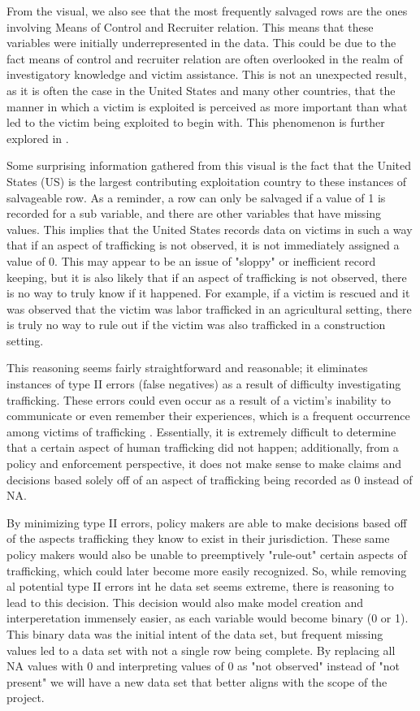 \documentclass{article} %
\begin{document}
From the visual, we also see that the most frequently salvaged rows are the ones involving Means of Control and Recruiter relation. This means that these variables were initially underrepresented in the data. This could be due to the fact means of control and recruiter relation are often overlooked in the realm of investigatory knowledge and victim assistance. This is not an unexpected result, as it is often the case in the United States and many other countries, that the manner in which a victim is exploited is perceived as more important than what led to the victim being exploited to begin with. This phenomenon is further explored in \cite{MediaRep}.

Some surprising information gathered from this visual is the fact that the United States (US) is the largest contributing exploitation country to these instances of salvageable row. As a reminder, a row can only be salvaged if a value of 1 is recorded for a sub variable, and there are other variables that have missing values. This implies that the United States records data on victims in such a way that if an aspect of trafficking is not observed, it is not immediately assigned a value of 0. This may appear to be an issue of "sloppy" or inefficient record keeping, but it is also likely that if an aspect of trafficking is not observed, there is no way to truly know if it happened. For example, if a victim is rescued and it was observed that the victim was labor trafficked in an agricultural setting, there is truly no way to rule out if the victim was also trafficked in a construction setting. 

This reasoning seems fairly straightforward and reasonable; it eliminates instances of type II errors (false negatives) as a result of difficulty investigating trafficking. These errors could even occur as a result of a victim's inability to communicate or even remember their experiences, which is a frequent occurrence among victims of trafficking \parencite{PTSD}. Essentially, it is extremely difficult to determine that a certain aspect of human trafficking did not happen; additionally, from a policy and enforcement perspective, it does not make sense to make claims and decisions based solely off of an aspect of trafficking being recorded as 0 instead of NA.

By minimizing type II errors, policy makers are able to make decisions based off of the aspects trafficking they know to exist in their jurisdiction. These same policy makers would also be unable to preemptively "rule-out" certain aspects of trafficking, which could later become more easily recognized. So, while removing al potential type II errors int he data set seems extreme, there is reasoning to lead to this decision. This decision would also make model creation and interperetation immensely easier, as each variable would become binary (0 or 1). This binary data was the initial intent of the data set, but frequent missing values led to a data set with not a single row being complete. By replacing all NA values with 0 and interpreting values of 0 as "not observed" instead of "not present" we will have a new data set that better aligns with the scope of the project.
\end{document}
